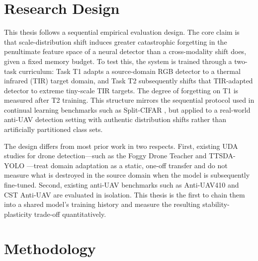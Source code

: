 
\section{Research Design}
\label{sec:research_design}

This thesis follows a sequential empirical evaluation design. The core claim is that scale-distribution shift induces greater catastrophic forgetting in the penultimate feature space of a neural detector than a cross-modality shift does, given a fixed memory budget. To test this, the system is trained through a two-task curriculum: Task T1 adapts a source-domain RGB detector to a thermal infrared (TIR) target domain, and Task T2 subsequently shifts that TIR-adapted detector to extreme tiny-scale TIR targets. The degree of forgetting on T1 is measured after T2 training. This structure mirrors the sequential protocol used in continual learning benchmarks such as Split-CIFAR \cite{rebuffi2017icarl}, but applied to a real-world anti-UAV detection setting with authentic distribution shifts rather than artificially partitioned class sets.

The design differs from most prior work in two respects. First, existing UDA studies for drone detection---such as the Foggy Drone Teacher \cite{zheng_foggy_2025} and TTSDA-YOLO \cite{zhang_ttsda-yolo_2025}---treat domain adaptation as a static, one-off transfer and do not measure what is destroyed in the source domain when the model is subsequently fine-tuned. Second, existing anti-UAV benchmarks such as Anti-UAV410 \cite{bohuang_410} and CST Anti-UAV \cite{xie2025cstantiuavthermalinfrared} are evaluated in isolation. This thesis is the first to chain them into a shared model's training history and measure the resulting stability-plasticity trade-off quantitatively.

\section{Methodology}
\label{sec:methodology}

